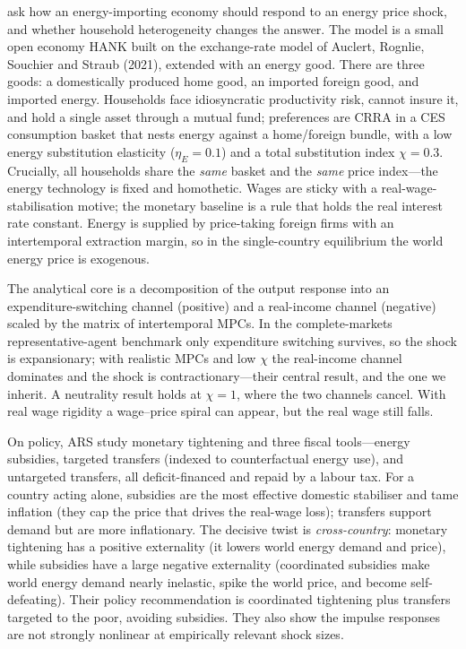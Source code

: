\documentclass[11pt,a4paper]{article}
\begin{document}
\citet{ARS2024} ask how an energy-importing economy should respond to an energy
price shock, and whether household heterogeneity changes the answer. The model
is a small open economy HANK built on the exchange-rate model of Auclert,
Rognlie, Souchier and Straub (2021), extended with an energy good. There are
three goods: a domestically produced home good, an imported foreign good, and
imported energy. Households face idiosyncratic productivity risk, cannot insure
it, and hold a single asset through a mutual fund; preferences are CRRA in a
CES consumption basket that nests energy against a home/foreign bundle, with a
low energy substitution elasticity ($\eta_E=0.1$) and a total substitution
index $\chi=0.3$. Crucially, all households share the \emph{same} basket and
the \emph{same} price index---the energy technology is fixed and homothetic.
Wages are sticky with a real-wage-stabilisation motive; the monetary baseline
is a rule that holds the real interest rate constant. Energy is supplied by
price-taking foreign firms with an intertemporal extraction margin, so in the
single-country equilibrium the world energy price is exogenous.

The analytical core is a decomposition of the output response into an
expenditure-switching channel (positive) and a real-income channel (negative)
scaled by the matrix of intertemporal MPCs. In the complete-markets
representative-agent benchmark only expenditure switching survives, so the
shock is expansionary; with realistic MPCs and low $\chi$ the real-income
channel dominates and the shock is contractionary---their central result, and
the one we inherit. A neutrality result holds at $\chi=1$, where the two
channels cancel. With real wage rigidity a wage--price spiral can appear, but
the real wage still falls.

On policy, ARS study monetary tightening and three fiscal tools---energy
subsidies, targeted transfers (indexed to counterfactual energy use), and
untargeted transfers, all deficit-financed and repaid by a labour tax. For a
country acting alone, subsidies are the most effective domestic stabiliser and
tame inflation (they cap the price that drives the real-wage loss); transfers
support demand but are more inflationary. The decisive twist is
\emph{cross-country}: monetary tightening has a positive externality (it lowers
world energy demand and price), while subsidies have a large negative
externality (coordinated subsidies make world energy demand nearly inelastic,
spike the world price, and become self-defeating). Their policy recommendation
is coordinated tightening plus transfers targeted to the poor, avoiding
subsidies. They also show the impulse responses are not strongly nonlinear at
empirically relevant shock sizes.
\end{document}
